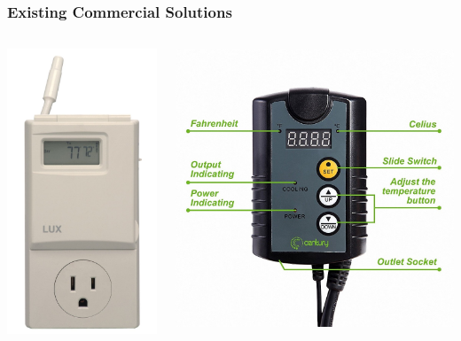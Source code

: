 \documentclass[aspectratio=169,11pt,hyperref={colorlinks=true}]{beamer}
\begin{document}
\begin{frame}
    \frametitle{Existing Commercial Solutions}
    \begin{columns}
        \begin{column}{.48\textwidth}
            \begin{center}
                \includegraphics[width=.55\textwidth]{off_the_shelf.jpg}
            \end{center}
        \end{column}
        \begin{column}{.48\textwidth}
            \begin{center}
                \includegraphics[width=.85\textwidth]{off_the_shelf_2.jpg}

\end{center}
\end{column}
\end{columns}
\end{frame}
\end{document}
